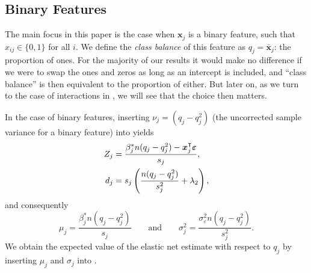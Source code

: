 \subsection{Binary Features}\label{sec:theory-binary-features}

The main focus in this paper is the case when \(\bm{x}_j\) is a binary feature, such that
\(x_{ij} \in \{0, 1\}\) for all \(i\). We define the \emph{class balance} of this feature
as \(q_j = \bar{\bm{x}}_j\): the proportion of ones. For the majority of our results it
would make no difference if we were to swap the ones and zeros as long as an intercept is
included, and ``class balance'' is then equivalent to the proportion of either. But later
on, as we turn to the case of interactions in , we will see that the
choice then matters.

In the case of binary features, inserting \(\nu_j = (q_j - q_j^2)\) (the uncorrected sample
variance for a binary feature) into  yields
\[
  \begin{aligned}
    {Z_j} & = \frac{\beta_j^* n(q_j - q_j^2) - \boldsymbol{x}_j^\intercal \boldsymbol{\varepsilon}}{s_j}, \\
    d_j   & = s_j\left(\frac{n(q_j - q_j^2)}{s_j^2} + \lambda_2\right),
  \end{aligned}
\]
and consequently
\[
  \mu_j = \frac{\beta^*_j n(q_j - q_j^2)}{s_j}\qquad \text{and} \qquad \sigma_j^2 = \frac{\sigma_\varepsilon^2n(q_j- q_j^2)}{s^2_j}.
\]
%
We obtain the expected value of the elastic net estimate with respect to \(q_j\) by
inserting \(\mu_j\) and \(\sigma_j\) into .

